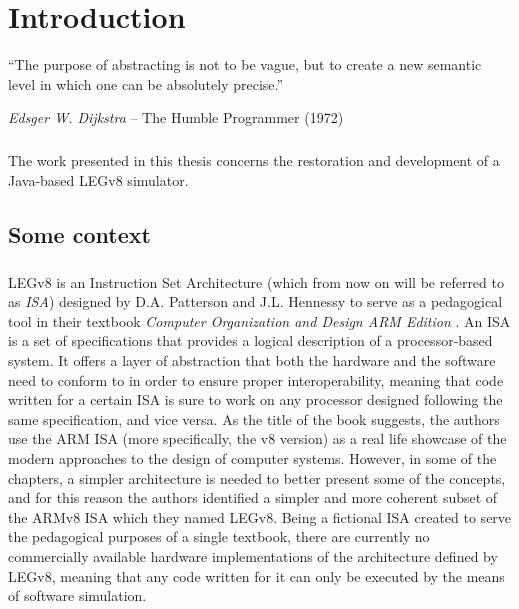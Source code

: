 \chapter{Introduction}

\epigraph{``The purpose of abstracting is not to be vague, but to create a new semantic level in which one can be absolutely precise.''}{\textit{Edsger W. Dijkstra} -- The Humble Programmer (1972)}

\paragraph{}
The work presented in this thesis concerns the restoration and development of a Java-based LEGv8 simulator.

\section*{Some context}
\paragraph{}
LEGv8 is an Instruction Set Architecture (which from now on will be referred to as \emph{ISA}) designed by D.A. Patterson and J.L. Hennessy to serve as a pedagogical tool in their textbook \emph{Computer Organization and Design
ARM Edition} \cite{patterson2016computer}.
An ISA is a set of specifications that provides a logical description of a processor-based system. It offers a layer of abstraction that both the hardware and the software need to conform to in order to ensure proper interoperability, meaning that code written for a certain ISA is sure to work on any processor designed following the same specification, and vice versa.
As the title of the book suggests, the authors use the ARM ISA (more specifically, the v8 version) as a real life showcase of the modern approaches to the design of computer systems. However, in some of the chapters, a simpler architecture is needed to better present some of the concepts, and for this reason the authors identified a simpler and more coherent subset of the ARMv8 ISA which they named LEGv8. 
Being a fictional ISA created to serve the pedagogical purposes of a single textbook, there are currently no commercially available hardware implementations of the architecture defined by LEGv8, meaning that any code written for it can only be executed by the means of software simulation.

